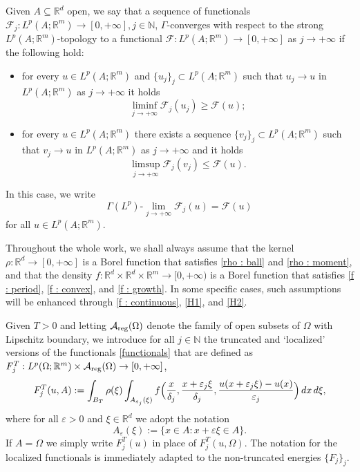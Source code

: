 \documentclass{article}
\theoremstyle{definition}
\newcommand{\e}{\varepsilon}
\newcommand{\ej}{\varepsilon_j}
\newcommand{\dej}{\delta_j}
\newcommand{\N}{\mathbb{N}}
\newcommand{\R}{\mathbb{R}}
\newcommand{\A}{\mathcal{A}}
\begin{document}
Given $A\subseteq\R^d$ open, we say that a sequence of functionals $\mathcal{F}_j: L^p(A;\R^m)\to[0,+\infty], j\in\N$, $\Gamma$-converges with respect to the strong $L^p(A;\R^m)$-topology to a functional $\mathcal{F}: L^p(A;\R^m)\to[0,+\infty]$ as $j\to+\infty$ if the following hold:
\begin{itemize}
    \item[(i)] for every $u\in L^p(A;\R^m)$ and $\{u_j\}_j\subset L^p(A;\R^m)$ such that $u_j\to u$ in $L^p(A;\R^m)$ as $j\to+\infty$ it holds
    \begin{equation*}
        \liminf_{j\to+\infty} \mathcal{F}_j(u_j) \geq \mathcal{F}(u);
    \end{equation*}
    \item[(ii)] for every $u\in L^p(A;\R^m)$ there exists a sequence $\{v_j\}_j\subset L^p(A;\R^m)$ such that $v_j\to u$ in $L^p(A;\R^m)$ as $j\to+\infty$ and it holds
    \begin{equation*}
        \limsup_{j\to+\infty} \mathcal{F}_j(v_j) \leq \mathcal{F}(u).
        \end{equation*}
\end{itemize}
In this case, we write
\begin{equation*}
    \Gamma(L^p)\text{-}\lim_{j\to+\infty} \mathcal{F}_j(u)=\mathcal{F}(u)
    \end{equation*}
for all $u\in L^p(A;\R^m)$.

Throughout the whole work, we shall always assume that the kernel $\rho:\R^d\to[0,+\infty]$ is a Borel function that satisfies \eqref{rho : ball} and \eqref{rho : moment}, and that the density $f:\R^d\times\R^d\times\R^m\to[0,+\infty)$ is a Borel function that satisfies \eqref{f : period}, \eqref{f : convex}, and \eqref{f : growth}. In some specific cases, such assumptions will be enhanced through \eqref{f : continuous}, \eqref{H1}, and \eqref{H2}.

Given $T>0$ and letting $\A_{\rm reg}(\Omega)$ denote the family of open subsets of $\Omega$ with Lipschitz boundary, we introduce for all $j\in \N$ the truncated and `localized' versions of the functionals \eqref{functionals} that are defined as $F_j^T: L^p(\Omega; \R^m)\times \A_{\rm reg}(\Omega)\to[0,+\infty]$,
\begin{equation}\label{truncatedfunctionals}
    F^T_j(u,A)  := \int_{B_T} \rho(\xi)\int_{A_{\ej}(\xi)} f\Bigl(\frac{x}{\dej},\frac{x+\ej\xi}{\dej},\frac{u(x+\ej\xi)-u(x)}{\ej}\Bigr)\, dx\,d\xi,
\end{equation}
 where for all $\e>0$ and $\xi\in \R^d$ we adopt the notation
\begin{equation*}
    A_\e(\xi):=\{x\in A : x+\e\xi\in A\}.  
    \end{equation*}
If $A=\Omega$ we simply write $F_j^T(u)$ in place of $F_j^T(u,\Omega)$. The notation for the localized functionals is immediately adapted to the non-truncated energies $\{F_j\}_j$.
\end{document}
